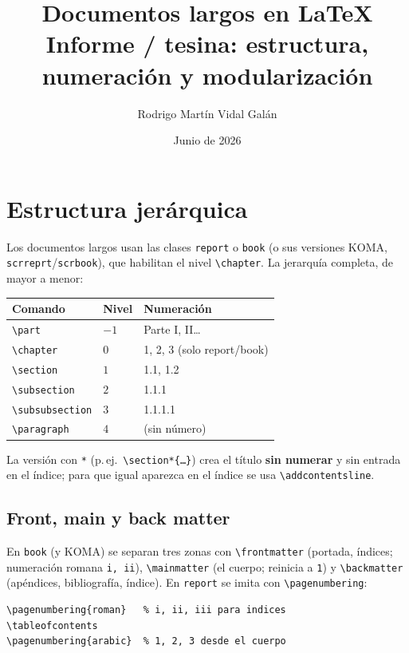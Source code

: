 \documentclass[11pt,a4paper]{report}
\title{\textbf{Documentos largos en \LaTeX}\\[4pt]
       \large Informe / tesina: estructura, numeración y modularización}
\author{Rodrigo Martín Vidal Galán}
\date{Junio de 2026}
\newcommand{\C}[1]{\texttt{\textbackslash #1}}
\begin{document}
\maketitle
\thispagestyle{empty}

\tableofcontents
\listoffigures
\listoftables
\clearpage

\chapter{Estructura jerárquica}
Los documentos largos usan las clases \texttt{report} o \texttt{book} (o sus
versiones KOMA, \texttt{scrreprt}/\texttt{scrbook}), que habilitan el nivel
\C{chapter}. La jerarquía completa, de mayor a menor:
\begin{center}\small
\renewcommand{\arraystretch}{1.2}
\begin{tabular}{@{}lll@{}}
\toprule
\textbf{Comando} & \textbf{Nivel} & \textbf{Numeración} \\
\midrule
\C{part}          & $-1$ & Parte I, II\dots \\
\C{chapter}       & $0$  & 1, 2, 3 (solo report/book) \\
\C{section}       & $1$  & 1.1, 1.2 \\
\C{subsection}    & $2$  & 1.1.1 \\
\C{subsubsection} & $3$  & 1.1.1.1 \\
\C{paragraph}     & $4$  & (sin número) \\
\bottomrule
\end{tabular}
\end{center}

\noindent La versión con \texttt{*} (p.\,ej.\ \C{section*\{\dots\}}) crea el
título \textbf{sin numerar} y sin entrada en el índice; para que igual aparezca
en el índice se usa \C{addcontentsline}.

\section{Front, main y back matter}
En \texttt{book} (y KOMA) se separan tres zonas con \C{frontmatter} (portada,
índices; numeración romana \texttt{i, ii}), \C{mainmatter} (el cuerpo;
reinicia a \texttt{1}) y \C{backmatter} (apéndices, bibliografía, índice). En
\texttt{report} se imita con \C{pagenumbering}:
\begin{lstlisting}
\pagenumbering{roman}   % i, ii, iii para indices
\tableofcontents
\pagenumbering{arabic}  % 1, 2, 3 desde el cuerpo
\end{lstlisting}
\end{document}
